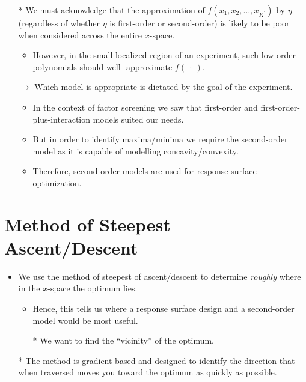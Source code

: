 \begin{itemize}
\begin{figure}[!htbp]
            \end{figure}
      \item[*] We must acknowledge that the approximation of $ f(x_1,x_2,\ldots,x_{K^\prime}) $ by $ \eta $ (regardless of whether $ \eta $ is
            first-order or second-order) is likely to be poor when considered across the entire $x$-space.
            \begin{itemize}[$\rightarrow$]
                  \item However, in the small localized region of an experiment, such low-order polynomials should well-
                        approximate $ f(\:\cdot\:) $.
            \end{itemize}
      \item[$\rightarrow$] Which model is appropriate is dictated by the goal of the experiment.
            \begin{itemize}
                  \item In the context of factor screening we saw that first-order and first-order-plus-interaction models
                        suited our needs.
                  \item But in order to identify maxima/minima we require the second-order model as it is capable of
                        modelling concavity/convexity.
                  \item Therefore, second-order models are used for response surface optimization.
            \end{itemize}
\end{itemize}
\section{Method of Steepest Ascent/Descent}
\begin{itemize}
      \item We use the method of steepest of ascent/descent to determine \emph{roughly} where in the $x$-space the optimum
            lies.
            \begin{itemize}
                  \item Hence, this tells us where a response surface design and a second-order model would be most
                        useful.
                  \item[*] We want to find the ``vicinity'' of the optimum.
            \end{itemize}
      \item[*] The method is gradient-based and designed to identify the direction that when traversed moves you
            toward the optimum as quickly as possible.
\end{itemize}
